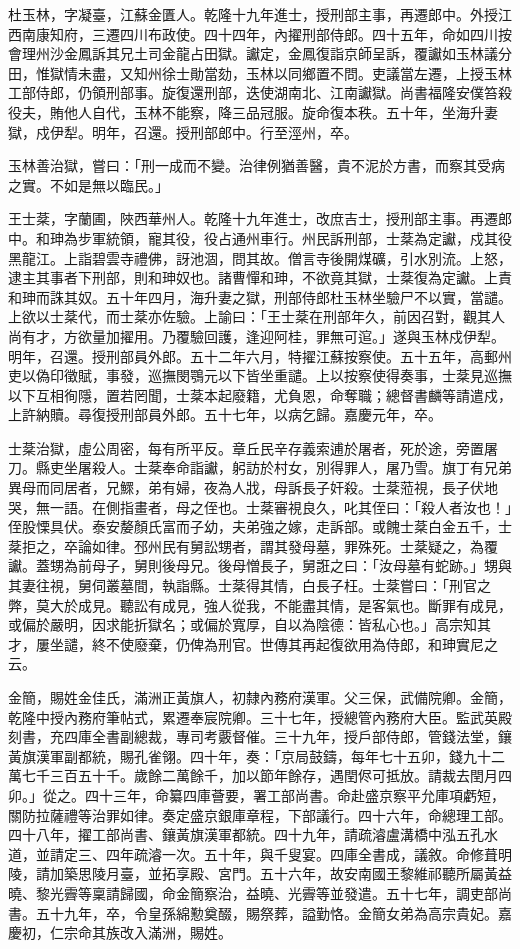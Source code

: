 \begin{pinyinscope}
杜玉林，字凝臺，江蘇金匱人。乾隆十九年進士，授刑部主事，再遷郎中。外授江西南康知府，三遷四川布政使。四十四年，內擢刑部侍郎。四十五年，命如四川按會理州沙金鳳訴其兄土司金龍占田獄。讞定，金鳳復詣京師呈訴，覆讞如玉林議分田，惟獄情未盡，又知州徐士勛當劾，玉林以同鄉置不問。吏議當左遷，上授玉林工部侍郎，仍領刑部事。旋復還刑部，迭使湖南北、江南讞獄。尚書福隆安僕笞殺役夫，賄他人自代，玉林不能察，降三品冠服。旋命復本秩。五十年，坐海升妻獄，戍伊犁。明年，召還。授刑部郎中。行至涇州，卒。

玉林善治獄，嘗曰：「刑一成而不變。治律例猶善醫，貴不泥於方書，而察其受病之實。不如是無以臨民。」

王士棻，字蘭圃，陜西華州人。乾隆十九年進士，改庶吉士，授刑部主事。再遷郎中。和珅為步軍統領，寵其役，役占通州車行。州民訴刑部，士棻為定讞，戍其役黑龍江。上詣碧雲寺禮佛，訝池涸，問其故。僧言寺後開煤礦，引水別流。上怒，逮主其事者下刑部，則和珅奴也。諸曹憚和珅，不欲竟其獄，士棻復為定讞。上責和珅而誅其奴。五十年四月，海升妻之獄，刑部侍郎杜玉林坐驗尸不以實，當譴。上欲以士棻代，而士棻亦佐驗。上諭曰：「王士棻在刑部年久，前因召對，觀其人尚有才，方欲量加擢用。乃覆驗回護，逢迎阿桂，罪無可逭。」遂與玉林戍伊犁。明年，召還。授刑部員外郎。五十二年六月，特擢江蘇按察使。五十五年，高郵州吏以偽印徵賦，事發，巡撫閔鶚元以下皆坐重譴。上以按察使得奏事，士棻見巡撫以下互相徇隱，置若罔聞，士棻本起廢籍，尤負恩，命奪職；總督書麟等請遣戍，上許納贖。尋復授刑部員外郎。五十七年，以病乞歸。嘉慶元年，卒。

士棻治獄，虛公周密，每有所平反。章丘民辛存義索逋於屠者，死於途，旁置屠刀。縣吏坐屠殺人。士棻奉命詣讞，躬訪於村女，別得罪人，屠乃雪。旗丁有兄弟異母而同居者，兄鰥，弟有婦，夜為人戕，母訴長子奸殺。士棻蒞視，長子伏地哭，無一語。在側指畫者，母之侄也。士棻審視良久，叱其侄曰：「殺人者汝也！」侄股慄具伏。泰安嫠顏氏富而子幼，夫弟強之嫁，走訴部。或餽士棻白金五千，士棻拒之，卒論如律。邳州民有舅訟甥者，謂其發母墓，罪殊死。士棻疑之，為覆讞。蓋甥為前母子，舅則後母兄。後母憎長子，舅誑之曰：「汝母墓有蛇跡。」甥與其妻往視，舅伺叢墓間，執詣縣。士棻得其情，白長子枉。士棻嘗曰：「刑官之弊，莫大於成見。聽訟有成見，強人從我，不能盡其情，是客氣也。斷罪有成見，或偏於嚴明，因求能折獄名；或偏於寬厚，自以為陰德：皆私心也。」高宗知其才，屢坐譴，終不使廢棄，仍俾為刑官。世傳其再起復欲用為侍郎，和珅實尼之云。

金簡，賜姓金佳氏，滿洲正黃旗人，初隸內務府漢軍。父三保，武備院卿。金簡，乾隆中授內務府筆帖式，累遷奉宸院卿。三十七年，授總管內務府大臣。監武英殿刻書，充四庫全書副總裁，專司考覈督催。三十九年，授戶部侍郎，管錢法堂，鑲黃旗漢軍副都統，賜孔雀翎。四十年，奏：「京局鼓鑄，每年七十五卯，錢九十二萬七千三百五十千。歲餘二萬餘千，加以節年餘存，遇閏侭可抵放。請裁去閏月四卯。」從之。四十三年，命纂四庫薈要，署工部尚書。命赴盛京察平允庫項虧短，關防拉薩禮等治罪如律。奏定盛京銀庫章程，下部議行。四十六年，命總理工部。四十八年，擢工部尚書、鑲黃旗漢軍都統。四十九年，請疏濬盧溝橋中泓五孔水道，並請定三、四年疏濬一次。五十年，與千叟宴。四庫全書成，議敘。命修葺明陵，請加築思陵月臺，並拓享殿、宮門。五十六年，故安南國王黎維祁聽所屬黃益曉、黎光霽等稟請歸國，命金簡察治，益曉、光霽等並發遣。五十七年，調吏部尚書。五十九年，卒，令皇孫綿懃奠醊，賜祭葬，謚勤恪。金簡女弟為高宗貴妃。嘉慶初，仁宗命其族改入滿洲，賜姓。


\end{pinyinscope}
